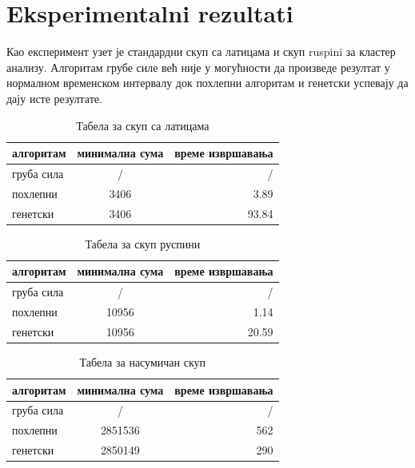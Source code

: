 \documentclass{article}
\begin{document}
\section{Eksperimentalni rezultati}
Као експеримент узет је стандардни скуп са латицама и скуп ruspini за кластер анализу.
Алгоритам грубе силе већ није у могућности да произведе резултат у нормалном временском интервалу док похлепни алгоритам и генетски успевају да дају исте резултате. 

\newpage

\begin{table}[h!]
  \begin{center}
    \caption{Табела за скуп са латицама}
    \label{tab:table1}
    \begin{tabular}{l|c|r}
      \textbf{алгоритам} & \textbf{минимална сума} & \textbf{време извршавања}\\
      \hline
      груба сила & / & /\\
      похлепни & 3406 & 3.89\\
      генетски & 3406 & 93.84\\
    \end{tabular}
  \end{center}
\end{table}

\begin{table}[h!]
  \begin{center}
    \caption{Табела за скуп руспини}
    \label{tab:table1}
    \begin{tabular}{l|c|r}
      \textbf{алгоритам} & \textbf{минимална сума} & \textbf{време извршавања}\\
      \hline
      груба сила & / & /\\
      похлепни & 10956 & 1.14\\
      генетски & 10956 & 20.59\\
    \end{tabular}
  \end{center}
\end{table}

\begin{table}[h!]
  \begin{center}
    \caption{Табела за насумичан скуп}
    \label{tab:table1}
    \begin{tabular}{l|c|r}
      \textbf{алгоритам} & \textbf{минимална сума} & \textbf{време извршавања}\\
      \hline
      груба сила & / & /\\
      похлепни & 2851536 & 562\\
      генетски & 2850149 & 290\\
    \end{tabular}
  \end{center}
\end{table}
\end{document}
